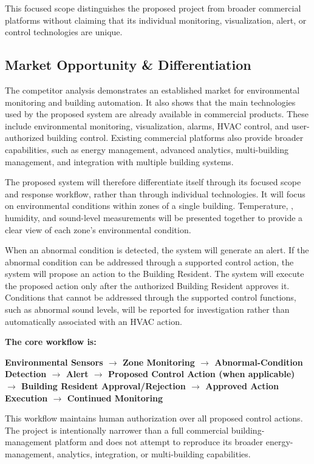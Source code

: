 \documentclass[11pt,a4paper]{article}
\begin{document}
This focused scope distinguishes the proposed project from broader commercial platforms without claiming that its individual monitoring, visualization, alert, or control technologies are unique.

\subsection{Market Opportunity \& Differentiation}
The competitor analysis demonstrates an established market for environmental monitoring and building automation. It also shows that the main technologies used by the proposed system are already available in commercial products. These include environmental monitoring, visualization, alarms, HVAC control, and user-authorized building control. Existing commercial platforms also provide broader capabilities, such as energy management, advanced analytics, multi-building management, and integration with multiple building systems.

The proposed system will therefore differentiate itself through its focused scope and response workflow, rather than through individual technologies. It will focus on environmental conditions within zones of a single building. Temperature, \COtwo, humidity, and sound-level measurements will be presented together to provide a clear view of each zone's environmental condition.

When an abnormal condition is detected, the system will generate an alert. If the abnormal condition can be addressed through a supported control action, the system will propose an action to the Building Resident. The system will execute the proposed action only after the authorized Building Resident approves it. Conditions that cannot be addressed through the supported control functions, such as abnormal sound levels, will be reported for investigation rather than automatically associated with an HVAC action.

\begin{zinfo}
{\bfseries\color{zteal} The core workflow is:}\par\smallskip
{\bfseries\color{znavy} Environmental Sensors $\rightarrow$ Zone Monitoring $\rightarrow$ Abnormal-Condition Detection $\rightarrow$ Alert $\rightarrow$ Proposed Control Action (when applicable) $\rightarrow$ Building Resident Approval/Rejection $\rightarrow$ Approved Action Execution $\rightarrow$ Continued Monitoring}
\end{zinfo}

This workflow maintains human authorization over all proposed control actions. The project is intentionally narrower than a full commercial building-management platform and does not attempt to reproduce its broader energy-management, analytics, integration, or multi-building capabilities.
\end{document}
